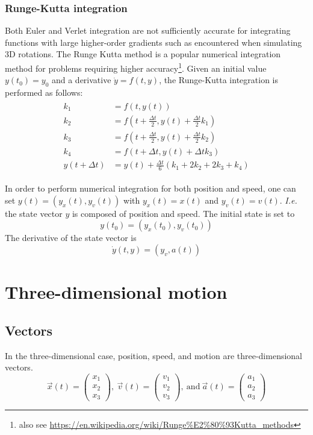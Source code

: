 \documentclass[12pt,a4paper,twoside]{article}
\begin{document}
\subsubsection{Runge-Kutta integration}
Both Euler and Verlet integration are not sufficiently accurate for integrating functions with large higher-order gradients such as encountered when simulating 3D rotations.
The Runge Kutta method is a popular numerical integration method for problems requiring higher accuracy\footnote{also see \url{https://en.wikipedia.org/wiki/Runge\%E2\%80\%93Kutta_methods}}.
Given an initial value $y(t_0)=y_0$ and a derivative $\dot{y}=f(t,y)$, the Runge-Kutta integration is performed as follows:
\begin{align*}
  \begin{split}
    k_1 &= f(t, y(t))\\
    k_2 &= f(t + \frac{\Delta t}{2}, y(t) + \frac{\Delta t}{2} k_1)\\
    k_3 &= f(t + \frac{\Delta t}{2}, y(t) + \frac{\Delta t}{2} k_2)\\
    k_4 &= f(t + \Delta t, y(t) + \Delta t k_3)\\
    y(t + \Delta t) &= y(t) + \frac{\Delta t}{6} (k_1 + 2 k_2 + 2 k_3 + k_4)
  \end{split}
\end{align*}

In order to perform numerical integration for both position and speed, one can set  $y(t) = (y_x(t), y_v(t))$ with $y_x(t)= x(t)$ and $y_v(t) = v(t)$.
\emph{I.e.} the state vector $y$ is composed of position and speed.
The initial state is set to
\begin{equation*}
  y(t_0) = (y_x(t_0), y_v(t_0))
\end{equation*}
The derivative of the state vector is
\begin{equation*}
  \dot{y}(t, y) = (y_v, a(t))
\end{equation*}

\section{Three-dimensional motion}
\subsection{Vectors}
In the three-dimensional case, position, speed, and motion are three-dimensional vectors.
\begin{equation*}
  \vec{x}(t) = \begin{pmatrix} x_1 \\ x_2 \\ x_3 \end{pmatrix}\mathrm{,\ }
  \vec{v}(t) = \begin{pmatrix} v_1 \\ v_2 \\ v_3 \end{pmatrix}\mathrm{,\ and\ }
  \vec{a}(t) = \begin{pmatrix} a_1 \\ a_2 \\ a_3 \end{pmatrix}
\end{equation*}


\end{document}
